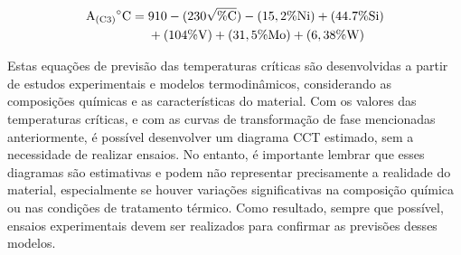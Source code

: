\begin{equation}
    \label{eq:A_C3}
    \begin{aligned}
    \mathrm{A\textsubscript{(C3)}}^{\circ}\mathrm{C} = {}   & 910 - (230\sqrt{\%\mathrm{C}}) - (15,2\%\mathrm{Ni}) + (44.7\%\mathrm{Si})\\
                                                            & + (104\%\mathrm{V}) + (31,5\%\mathrm{Mo}) + (6,38\%\mathrm{W})
\end{aligned}
\end{equation}
\par
Estas equações de previsão das temperaturas críticas são desenvolvidas a partir de estudos experimentais e modelos termodinâmicos, considerando as composições químicas e as características do material. Com os valores das temperaturas críticas, e com as curvas de transformação de fase mencionadas anteriormente, é possível desenvolver um diagrama CCT estimado, sem a necessidade de realizar ensaios. No entanto, é importante lembrar que esses diagramas são estimativas e podem não representar precisamente a realidade do material, especialmente se houver variações significativas na composição química ou nas condições de tratamento térmico. Como resultado, sempre que possível, ensaios experimentais devem ser realizados para confirmar as previsões desses modelos.
